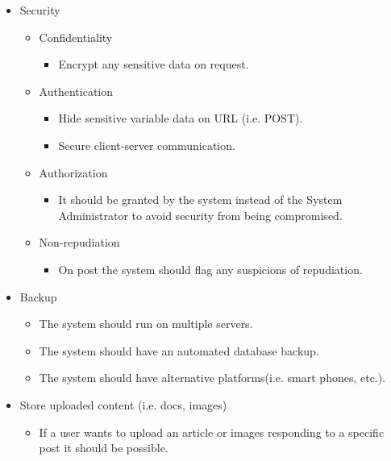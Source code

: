 \begin{itemize}	
		\item Security
			\begin{itemize}
				\item Confidentiality 
					\begin{itemize}
						\item Encrypt any sensitive data on request.  
					\end{itemize}
						
				\item Authentication 
					\begin{itemize}
						\item Hide sensitive variable data on URL (i.e. POST).
						\item Secure client-server communication.   
					\end{itemize}
				
				\item Authorization 
					\begin{itemize}
						\item It should be granted by the system instead of the System Administrator to avoid security from being compromised.    
					\end{itemize}
					
				\item Non-repudiation
					\begin{itemize}
						\item On post the system should flag any suspicions of repudiation.     
					\end{itemize}					
			\end{itemize}
			
		\item Backup
		  \begin{itemize}
			  \item The system should run on multiple servers.
			  \item The system should have an automated database backup.
			  \item The system should have alternative platforms(i.e. smart phones, etc.).
		  \end{itemize}					
		  
		\item Store uploaded content (i.e. docs, images)
		  \begin{itemize}
			  \item If a user wants to upload an article or images responding to a specific post it should be possible.
		  \end{itemize}					
		
\end{itemize}
